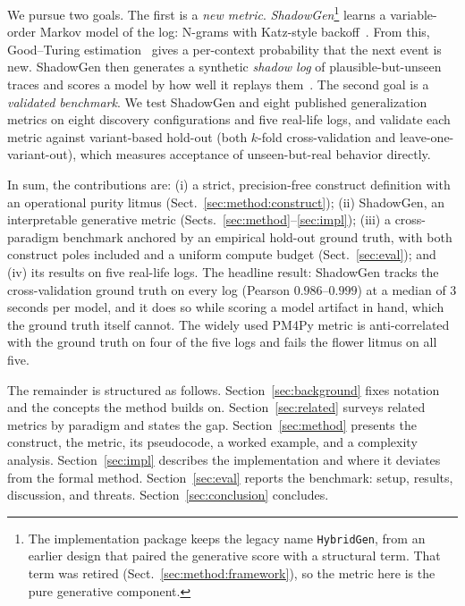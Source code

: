\documentclass[runningheads]{llncs}
\begin{document}
We pursue two goals. The first is a \emph{new metric}. \emph{ShadowGen}\footnote{The implementation package keeps the legacy name \texttt{HybridGen}, from an earlier design that paired the generative score with a structural term. That term was retired (Sect.~\ref{sec:method:framework}), so the metric here is the pure generative component.} learns a variable-order Markov model of the log: N-grams with Katz-style backoff~\cite{katz1987}. From this, Good--Turing estimation~\cite{gale1995gt} gives a per-context probability that the next event is new. ShadowGen then generates a synthetic \emph{shadow log} of plausible-but-unseen traces and scores a model by how well it replays them~\cite{rozinat2008conformance}. The second goal is a \emph{validated benchmark}. We test ShadowGen and eight published generalization metrics on eight discovery configurations and five real-life logs, and validate each metric against variant-based hold-out (both $k$-fold cross-validation and leave-one-variant-out), which measures acceptance of unseen-but-real behavior directly.

In sum, the contributions are: (i) a strict, precision-free construct definition with an operational purity litmus (Sect.~\ref{sec:method:construct}); (ii) ShadowGen, an interpretable generative metric (Sects.~\ref{sec:method}--\ref{sec:impl}); (iii) a cross-paradigm benchmark anchored by an empirical hold-out ground truth, with both construct poles included and a uniform compute budget (Sect.~\ref{sec:eval}); and (iv) its results on five real-life logs. The headline result: ShadowGen tracks the cross-validation ground truth on every log (Pearson $0.986$--$0.999$) at a median of $3$ seconds per model, and it does so while scoring a model artifact in hand, which the ground truth itself cannot. The widely used PM4Py metric is anti-correlated with the ground truth on four of the five logs and fails the flower litmus on all five.

The remainder is structured as follows. Section~\ref{sec:background} fixes notation and the concepts the method builds on. Section~\ref{sec:related} surveys related metrics by paradigm and states the gap. Section~\ref{sec:method} presents the construct, the metric, its pseudocode, a worked example, and a complexity analysis. Section~\ref{sec:impl} describes the implementation and where it deviates from the formal method. Section~\ref{sec:eval} reports the benchmark: setup, results, discussion, and threats. Section~\ref{sec:conclusion} concludes.

\end{document}
